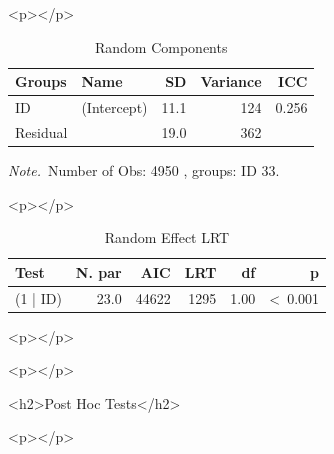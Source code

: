 \documentclass[a4paper,man,hidelinks,floatsintext]{apa7}
\begin{document}
        <p></p>
      
    
\begin{table}[!htbp]
\caption{Random Components}
\label{tab:Table_4}
\begin{adjustbox}{max size={\columnwidth}{\textheight}}
\centering
\begin{tabular}{llrrr}
\hline
Groups   & Name        &   SD & Variance &   ICC \\
\hline
ID       & (Intercept) & 11.1 &      124 & 0.256 \\
Residual & ~           & 19.0 &      362 &     ~ \\
\hline
\end{tabular}
\end{adjustbox}
\begin{tablenotes} {
\small
\textit{Note.}~Number of Obs: 4950 , groups: ID 33. \\
}
\end{tablenotes}
\end{table}
      
        <p></p>
      
    
\begin{table}[!htbp]
\caption{Random Effect LRT}
\label{tab:Table_5}
\begin{adjustbox}{max size={\columnwidth}{\textheight}}
\centering
\begin{tabular}{lrrrrr}
\hline
Test     & N. par &   AIC &  LRT &   df &               p \\
\hline
(1 | ID) &   23.0 & 44622 & 1295 & 1.00 & \textless~0.001 \\
\hline
\end{tabular}
\end{adjustbox}
\begin{tablenotes} {
\small
}
\end{tablenotes}
\end{table}
      
        <p></p>
      
    
      
      
    
      
        <p></p>
      
    <h2>Post Hoc Tests</h2>
      
        <p></p>
      
\end{document}
